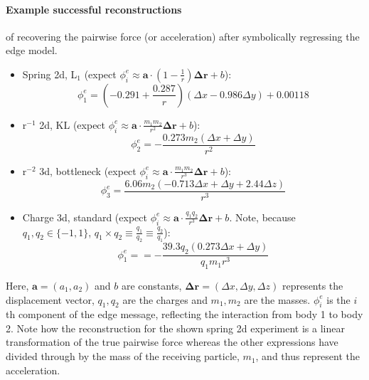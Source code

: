 \documentclass[11pt]{article}
\begin{document}
\paragraph*{Example successful reconstructions} of recovering the pairwise force (or acceleration) after symbolically regressing the edge model.
    \begin{itemize}
        \item
        Spring 2d, L$_1$ (expect $\phi^{e}_i \approx \mathbf{a} \cdot (1-\frac{1}{r}) \mathbf{\Delta {r}} + b$):
        $$
        \phi^{e}_1 = (-0.291 + \frac{0.287}{r})(\Delta x - 0.986 \Delta y) + 0.00118
        $$
        \item 
        r$^{-1}$ 2d, KL (expect $\phi^{e}_i \approx \mathbf{a} \cdot \frac{m_1 m_2}{r^2} \mathbf{\Delta r} + b$):
        $$\phi^{e}_2 = -\frac{0.273m_2(\Delta x + \Delta y)}{r^2}$$
        \item 
        r$^{-2}$ 3d, bottleneck (expect $\phi^{e}_i \approx \mathbf{a} \cdot \frac{m_1 m_2}{r^3} \mathbf{\Delta r} + b$):
        $$\phi^{e}_3 = \frac{6.06m_2(-0.713\Delta x + \Delta y + 2.44\Delta z)}{r^3}$$
        \item 
        Charge 3d, standard (expect $\phi^{e}_i \approx \mathbf{a} \cdot \frac{q_1 q_2}{r^3} \mathbf{\Delta r} + b$. Note, because $q_1, q_2 \in \{-1, 1\}$, $q_1 \times q_2 \equiv \frac{q_1}{q_2} \equiv \frac{q_2}{q_1}$):
        $$\phi^{e}_1 = = -\frac{39.3q_2(0.273\Delta x + \Delta y)}{ q_1 m_1r^3}$$
    \end{itemize}
    Here, $\mathbf{a} = (a_1, a_2)$ and $b$ are constants, $\mathbf{\Delta r} = (\Delta x, \Delta y, \Delta z)$ represents the displacement vector, $q_1, q_2$ are the charges and $m_1, m_2$ are the masses. $\phi^{e}_i$ is the $i$th component of the edge message, reflecting the interaction from body 1 to body 2. Note how the reconstruction for the shown spring 2d experiment is a linear transformation of the true pairwise force whereas the other expressions have divided through by the mass of the receiving particle, $m_1$, and thus represent the acceleration.
\end{document}
